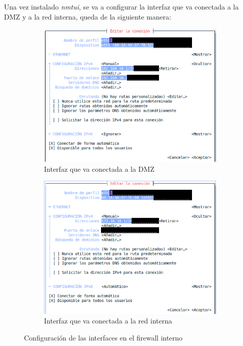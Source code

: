 \documentclass[11pt]{report}
\begin{document}
Una vez instalado \emph{nmtui}, se va a configurar la interfaz que va conectada a la DMZ y a la red interna, queda de la siguiente
manera:
\begin{figure}[H]
  \begin{subfigure}{0.5\textwidth}
    \centering
    \includegraphics[scale=0.44]{img/fw-interno_interface_to_DMZ.png}
    \caption{Interfaz que va conectada a la DMZ}
  \end{subfigure}%
  \begin{subfigure}{0.5\textwidth}
    \centering
    \includegraphics[scale=0.44]{img/fw-interno_interface_to_LAN.png}
    \caption{Interfaz que va conectada a la red interna}
  \end{subfigure}
  \caption{Configuración de las interfaces en el firewall interno}
\end{figure}
\end{document}
